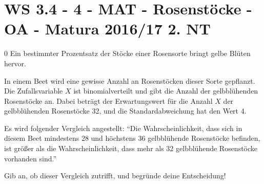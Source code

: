 \section{WS 3.4 - 4 - MAT - Rosenstöcke - OA - Matura 2016/17 2. NT}


\begin{langesbeispiel} \item[0] %
Ein bestimmter Prozentsatz der Stöcke einer Rosensorte bringt gelbe Blüten hervor.

In einem Beet wird eine gewisse Anzahl an Rosenstöcken dieser Sorte gepflanzt. Die Zufallsvariable $X$ ist binomialverteilt und gibt die Anzahl der gelbblühenden Rosenstöcke an. Dabei beträgt der Erwartungswert für die Anzahl $X$ der gelbblühenden Rosenstöcke 32, und die Standardabweichung hat den Wert 4.

Es wird folgender Vergleich angestellt:
"`Die Wahrscheinlichkeit, dass sich in diesem Beet mindestens 28 und höchstens 36 gelbblühende Rosenstöcke befinden, ist größer als die Wahrscheinlichkeit, dass mehr als 32 gelbblühende Rosenstöcke vorhanden sind."'

Gib an, ob dieser Vergleich zutrifft, und begründe deine Entscheidung!\leer

\end{langesbeispiel}
